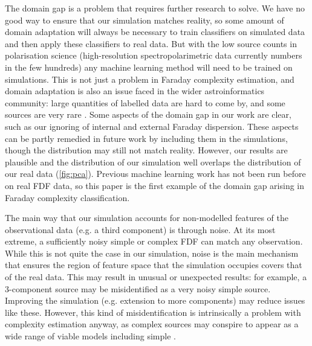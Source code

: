   The domain gap is a problem that requires further research to solve. We have no good way to ensure that our simulation matches reality, so some amount of domain adaptation will always be necessary to train classifiers on simulated data and then apply these classifiers to real data. But with the low source counts in polarisation science (high-resolution spectropolarimetric data currently numbers in the few hundreds) any machine learning method will need to be trained on simulations. This is not just a problem in Faraday complexity estimation, and domain adaptation is also an issue faced in the wider astroinformatics community: large quantities of labelled data are hard to come by, and some sources are very rare \citep[e.g. gravitational wave detections or fast radio bursts;][]{zevin17gravityspy, gebhard19convolutional, agarwal20fetch}. Some aspects of the domain gap in our work are clear, such as our ignoring of internal and external Faraday dispersion. These aspects can be partly remedied in future work by including them in the simulations, though the distribution may still not match reality. However, our results are plausible and the distribution of our simulation well overlaps the distribution of our real data (\autoref{fig:pca}). Previous machine learning work \citep[e.g.][]{brown_classifying_2018} has not been run before on real FDF data, so this paper is the first example of the domain gap arising in Faraday complexity classification.

  The main way that our simulation accounts for non-modelled features of the observational data (e.g. a third component) is through noise. At its most extreme, a sufficiently noisy simple or complex FDF can match any observation. While this is not quite the case in our simulation, noise is the main mechanism that ensures the region of feature space that the simulation occupies covers that of the real data. This may result in unusual or unexpected results: for example, a 3-component source may be misidentified as a very noisy simple source. Improving the simulation (e.g. extension to more components) may reduce issues like these. However, this kind of misidentification is intrinsically a problem with complexity estimation anyway, as complex sources may conspire to appear as a wide range of viable models including simple \citep{sun15comparison}.

